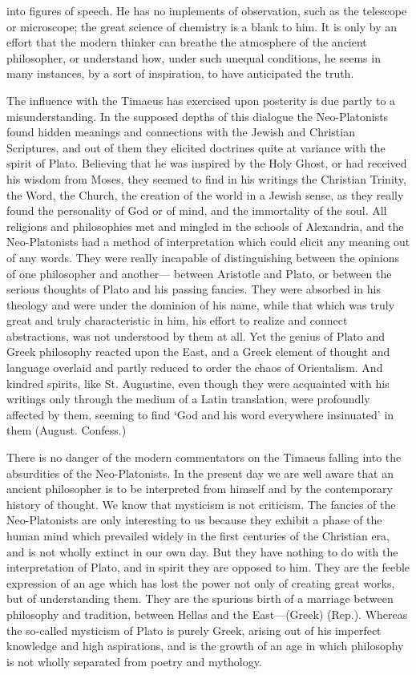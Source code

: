 \documentclass[11pt,letter]{article}
\begin{document}
into figures of speech. He has no implements of observation, such as the telescope or microscope; the great science of chemistry is a blank to him. It is only by an effort that the modern thinker can breathe the atmosphere of the ancient philosopher, or understand how, under such unequal conditions, he seems in many instances, by a sort of inspiration, to have anticipated the truth.

\par  The influence with the Timaeus has exercised upon posterity is due partly to a misunderstanding. In the supposed depths of this dialogue the Neo-Platonists found hidden meanings and connections with the Jewish and Christian Scriptures, and out of them they elicited doctrines quite at variance with the spirit of Plato. Believing that he was inspired by the Holy Ghost, or had received his wisdom from Moses, they seemed to find in his writings the Christian Trinity, the Word, the Church, the creation of the world in a Jewish sense, as they really found the personality of God or of mind, and the immortality of the soul. All religions and philosophies met and mingled in the schools of Alexandria, and the Neo-Platonists had a method of interpretation which could elicit any meaning out of any words. They were really incapable of distinguishing between the opinions of one philosopher and another— between Aristotle and Plato, or between the serious thoughts of Plato and his passing fancies. They were absorbed in his theology and were under the dominion of his name, while that which was truly great and truly characteristic in him, his effort to realize and connect abstractions, was not understood by them at all. Yet the genius of Plato and Greek philosophy reacted upon the East, and a Greek element of thought and language overlaid and partly reduced to order the chaos of Orientalism. And kindred spirits, like St. Augustine, even though they were acquainted with his writings only through the medium of a Latin translation, were profoundly affected by them, seeming to find ‘God and his word everywhere insinuated’ in them (August. Confess.)

\par  There is no danger of the modern commentators on the Timaeus falling into the absurdities of the Neo-Platonists. In the present day we are well aware that an ancient philosopher is to be interpreted from himself and by the contemporary history of thought. We know that mysticism is not criticism. The fancies of the Neo-Platonists are only interesting to us because they exhibit a phase of the human mind which prevailed widely in the first centuries of the Christian era, and is not wholly extinct in our own day. But they have nothing to do with the interpretation of Plato, and in spirit they are opposed to him. They are the feeble expression of an age which has lost the power not only of creating great works, but of understanding them. They are the spurious birth of a marriage between philosophy and tradition, between Hellas and the East—(Greek) (Rep.). Whereas the so-called mysticism of Plato is purely Greek, arising out of his imperfect knowledge and high aspirations, and is the growth of an age in which philosophy is not wholly separated from poetry and mythology.
\end{document}
